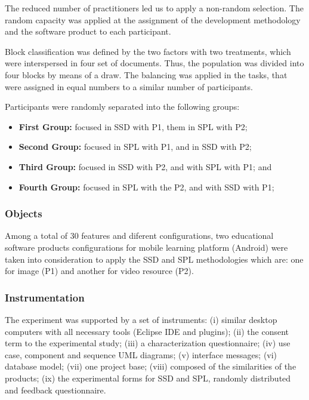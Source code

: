 The reduced number of practitioners led us to apply a non-random selection. The random capacity was applied at the assignment of the development methodology and the software product to each participant. 

Block classification was defined by the two factors with two treatments, which were interspersed in four set of documents. Thus, the population was divided into four blocks by means of a draw. The balancing was applied in the tasks, that were assigned in equal numbers to a similar number of participants.

Participants were randomly separated into the following groups:

\begin{itemize}
\item \textbf{First Group:} focused in SSD with P1, them in SPL with P2;

\item \textbf{Second Group:} focused in SPL with P1, and in SSD with P2;

\item \textbf{Third Group:} focused in SSD with P2, and with SPL with P1; and

\item \textbf{Fourth Group:} focused in SPL with the P2, and with SSD with P1;
\end{itemize}

\subsubsection{Objects}

Among a total of 30 features and diferent configurations, two educational software products configurations for mobile learning platform (Android) were taken into consideration to apply the SSD and SPL methodologies which are: one for image (P1) and another for video resource (P2).

\subsubsection{Instrumentation}

The experiment was supported by a set of instruments: (i) similar desktop computers with all necessary tools (Eclipse IDE and plugins); (ii) the consent term to the experimental study; (iii) a characterization questionnaire; (iv) use case, component and sequence UML diagrams; (v) interface messages; (vi) database model; (vii) one project base; (viii) composed of the similarities of the products; (ix) the experimental forms for SSD and SPL, randomly distributed and feedback questionnaire.

